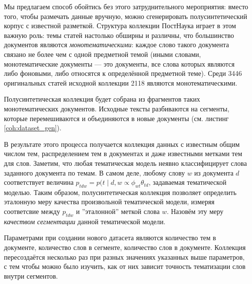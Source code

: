 Мы предлагаем способ обойтись без этого затруднительного мероприятия: вместо того, чтобы размечать данные вручную, можно сгенерировать полусинтетический корпус с известной разметкой. Структура коллекции ПостНаука играет в этом важную роль: темы статей настолько обширны и различны, что большинство документов являются \textit{монотематическими}: каждое слово такого документа связано не более чем с одной предметной темой (иными словами, монотематические документы --- это документы, все слова которых являются либо фоновыми, либо относятся к определённой предметной теме). Среди 3446 оригинальных статей исходной коллекции 2118 являются монотематическими. 

Полусинтетическая коллекция будет собрана из фрагментов таких монотематических документов. Исходные тексты разбиваются на сегменты, которые перемешиваются и объединяются в новые документы (см. листинг \ref{coh:dataset_gen}).


  В результате этого процесса получается коллекция данных с известным общим числом тем, распределением тем в документах и даже известными метками тем для слов. Заметим, что любая тематическая модель неявно классифицирует слова заданного документа по темам. В самом деле, любому слову $w$ из документа $d$ соответствует величина $p_{tdw} = p(t \mid d, w \propto \phi_{wt}\theta_{td}$, задаваемая тематической моделью. Таким образом, полусинтетическая коллекция позволяет определить эталонную меру качества произвольной тематической модели, измеряя соответсвие между $p_{tdw}$ и ''эталонной'' меткой слова $w$. Назовём эту меру \textit{качеством сегментации} данной тематической модели. 
  
  Параметрами при создании нового датасета являются количество тем в документе, количество слов в сегменте, количество слов в документе.  Коллекция пересоздаётся несколько раз при разных значениях указанных выше параметров, с тем чтобы можно было изучить, как от них зависит точность тематизации слов внутри сегментов.


  
  
